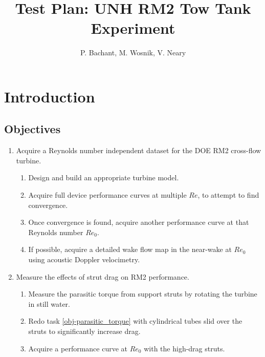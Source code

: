 \documentclass{article}
\author{P. Bachant, M. Wosnik, V. Neary}
\title{Test Plan: UNH RM2 Tow Tank Experiment}
\begin{document}
\maketitle

\section{Introduction}

\subsection{Objectives}

\begin{enumerate}

	\item Acquire a Reynolds number independent dataset for the DOE RM2 cross-flow
	turbine.

		\begin{enumerate}
			\item Design and build an appropriate turbine model.
		
			\item Acquire full device performance curves at multiple $Re$, to attempt to
			find convergence.
		  
			\item Once convergence is found, acquire another performance curve at that
			Reynolds number $Re_0$.
		
			\item If possible, acquire a detailed wake flow map in the near-wake at
			$Re_0$ using acoustic Doppler velocimetry.
		\end{enumerate}
	
	\item Measure the effects of strut drag on RM2 performance.
	
	\begin{enumerate}
		\item Measure the parasitic torque from support struts by rotating the turbine
		in still water. \label{obj-parasitic_torque}
		
		\item Redo task \ref{obj-parasitic_torque} with cylindrical tubes slid over
		the struts to significantly increase drag.
		
		\item Acquire a performance curve at $Re_0$ with the high-drag struts. 
	\end{enumerate}
	
\end{enumerate}
\end{document}
